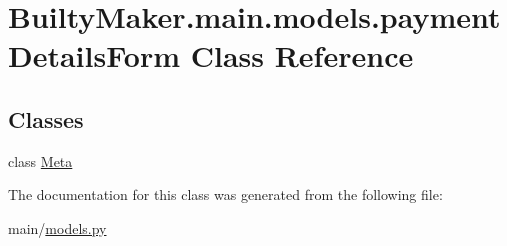 \hypertarget{classBuiltyMaker_1_1main_1_1models_1_1paymentDetailsForm}{\section{\-Builty\-Maker.\-main.\-models.\-payment\-Details\-Form \-Class \-Reference}
\label{classBuiltyMaker_1_1main_1_1models_1_1paymentDetailsForm}
}
\subsection*{\-Classes}
\begin{DoxyCompactItemize}
\item 
class \hyperlink{classBuiltyMaker_1_1main_1_1models_1_1paymentDetailsForm_1_1Meta}{\-Meta}
\end{DoxyCompactItemize}


\-The documentation for this class was generated from the following file\-:\begin{DoxyCompactItemize}
\item 
main/\hyperlink{models_8py}{models.\-py}\end{DoxyCompactItemize}
